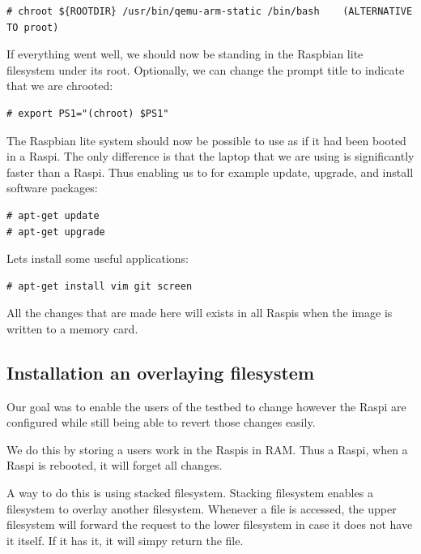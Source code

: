 \begin{lstlisting}[]
# chroot ${ROOTDIR} /usr/bin/qemu-arm-static /bin/bash    (ALTERNATIVE TO proot)
\end{lstlisting}
\FloatBarrier
\vspace{-5mm}

If everything went well, we should now be standing in the Raspbian lite filesystem
under its root. Optionally, we can change the prompt title to indicate that we
are chrooted:

\begin{lstlisting}[]
# export PS1="(chroot) $PS1"
\end{lstlisting}
\FloatBarrier
\vspace{-5mm}

The Raspbian lite system should now be possible to use as if it had been booted
in a \ac{Raspi}. The only difference is that the laptop that we are using is
significantly faster than a \ac{Raspi}. Thus enabling us to for example update,
upgrade, and install software packages:

\begin{lstlisting}[]
# apt-get update
# apt-get upgrade
\end{lstlisting}
\FloatBarrier
\vspace{-5mm}

Lets install some useful applications:
\begin{lstlisting}[]
# apt-get install vim git screen
\end{lstlisting}
\FloatBarrier
\vspace{-5mm}

All the changes that are made here will exists in all \ac{Raspi}s when the
image is written to a memory card.

\subsection{Installation an overlaying filesystem}

Our goal was to enable the users of the testbed to change however the
\ac{Raspi} are configured while still being able to revert those changes easily.

We do this by storing a users work in the \ac{Raspi}s in \ac{RAM}. Thus a
\ac{Raspi}, when a \ac{Raspi} is rebooted, it will forget all changes.

A way to do this is using stacked filesystem. Stacking filesystem enables
a filesystem to overlay another filesystem. Whenever a file is accessed,
the upper filesystem will forward the request to the lower filesystem in
case it does not have it itself. If it has it, it will simpy return the file.

